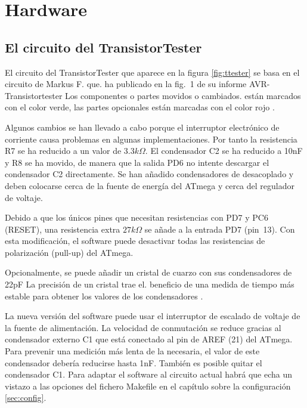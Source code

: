 \chapter{Hardware}

\section{El circuito del TransistorTester}
\label{sec:hardware}

El circuito del  TransistorTester que aparece en  la figura \ref{fig:ttester} se basa  en el circuito de  Markus F. que.
\cite{Frejek} ha publicado en la fig.~1 de su informe AVR-Transistortester Los componentes o partes movidos o cambiados.
están marcados con el color verde, las partes opcionales están marcadas con el color rojo                            .

Algunos  cambios se  han llevado  a cabo  porque el  interruptor electrónico  de corriente  causa problemas  en algunas
implementaciones. Por  tanto la resistencia  R7 se ha  reducido a un  valor de \(3.3k\Omega\).  El condensador C2  se ha
reducido a 10nF y R8 se  ha movido, de manera que la salida PD6 no intente  descargar el condensador C2 directamente. Se
han añadido  condensadores de  desacoplado y deben  colocarse cerca  de la fuente  de energía del  ATmega y  cerca del
regulador de voltaje.

Debido a que los únicos pines que necesitan resistencias  con PD7 y PC6 (RESET), una resistencia extra \(27k\Omega\) se
añade  a la  entrada PD7  (pin~13). Con  esta modificación,  el software  puede desactivar  todas las  resistencias de
polarización (pull-up) del ATmega.

Opcionalmente, se puede añadir un cristal de cuarzo con sus  condensadores de 22pF La precisión de un cristal trae el.
beneficio de una medida de tiempo más estable para obtener los valores de los condensadores                           .

La nueva  versión del  software puede usar  el interruptor  de escalado de  voltaje de la  fuente de  alimentación. La
velocidad de  conmutación se  reduce gracias al  condensador externo  C1 que está  conectado al pin  de AREF  (21) del
ATmega. Para prevenir  una medición más lenta de la  necesaria, el valor de este condensador  debería reducirse hasta
1nF. También  es posible  quitar el condensador  C1. Para  adaptar el software  al circuito actual  habrá que  echa un
vistazo a las opciones del fichero Makefile en el capítulo sobre la configuración \ref{sec:config}.

